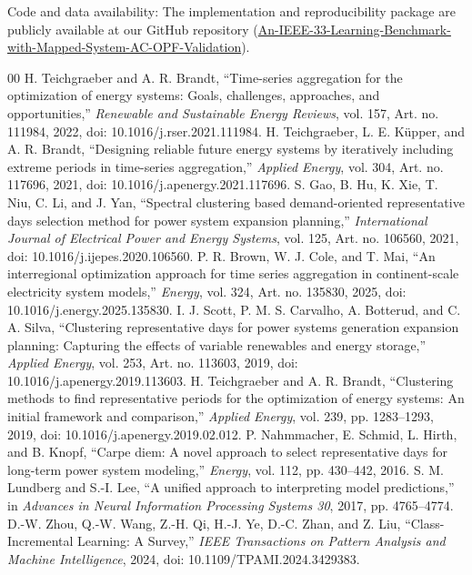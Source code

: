 \documentclass[journal]{IEEEtran}
\begin{document}
Code and data availability: The implementation and reproducibility package are publicly available at our GitHub repository (\href{https://github.com/aszybaiye/An-IEEE-33-Learning-Benchmark-with-Mapped-System-AC-OPF-Validation}{An-IEEE-33-Learning-Benchmark-with-Mapped-System-AC-OPF-Validation}).

\begin{thebibliography}{00}
 H. Teichgraeber and A. R. Brandt, ``Time-series aggregation for the optimization of energy systems: Goals, challenges, approaches, and opportunities,'' \emph{Renewable and Sustainable Energy Reviews}, vol. 157, Art. no. 111984, 2022, doi: 10.1016/j.rser.2021.111984.
 H. Teichgraeber, L. E. K\"upper, and A. R. Brandt, ``Designing reliable future energy systems by iteratively including extreme periods in time-series aggregation,'' \emph{Applied Energy}, vol. 304, Art. no. 117696, 2021, doi: 10.1016/j.apenergy.2021.117696.
 S. Gao, B. Hu, K. Xie, T. Niu, C. Li, and J. Yan, ``Spectral clustering based demand-oriented representative days selection method for power system expansion planning,'' \emph{International Journal of Electrical Power and Energy Systems}, vol. 125, Art. no. 106560, 2021, doi: 10.1016/j.ijepes.2020.106560.
 P. R. Brown, W. J. Cole, and T. Mai, ``An interregional optimization approach for time series aggregation in continent-scale electricity system models,'' \emph{Energy}, vol. 324, Art. no. 135830, 2025, doi: 10.1016/j.energy.2025.135830.
 I. J. Scott, P. M. S. Carvalho, A. Botterud, and C. A. Silva, ``Clustering representative days for power systems generation expansion planning: Capturing the effects of variable renewables and energy storage,'' \emph{Applied Energy}, vol. 253, Art. no. 113603, 2019, doi: 10.1016/j.apenergy.2019.113603.
 H. Teichgraeber and A. R. Brandt, ``Clustering methods to find representative periods for the optimization of energy systems: An initial framework and comparison,'' \emph{Applied Energy}, vol. 239, pp. 1283--1293, 2019, doi: 10.1016/j.apenergy.2019.02.012.
 P. Nahmmacher, E. Schmid, L. Hirth, and B. Knopf, ``Carpe diem: A novel approach to select representative days for long-term power system modeling,'' \emph{Energy}, vol. 112, pp. 430--442, 2016.
 S. M. Lundberg and S.-I. Lee, ``A unified approach to interpreting model predictions,'' in \emph{Advances in Neural Information Processing Systems 30}, 2017, pp. 4765--4774.
 D.-W. Zhou, Q.-W. Wang, Z.-H. Qi, H.-J. Ye, D.-C. Zhan, and Z. Liu, ``Class-Incremental Learning: A Survey,'' \emph{IEEE Transactions on Pattern Analysis and Machine Intelligence}, 2024, doi: 10.1109/TPAMI.2024.3429383.

\end{thebibliography}
\end{document}
